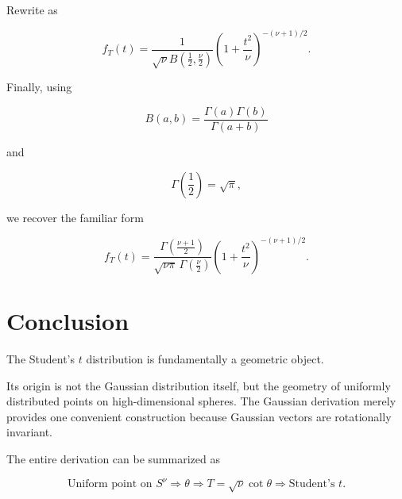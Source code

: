 \documentclass[11pt]{article}
\begin{document}
	Rewrite as
	
	\[
	\boxed{
		f_T(t)
		=
		\frac1{
			\sqrt{\nu}
			B\left(\frac12,\frac\nu2\right)
		}
		\left(
		1+\frac{t^2}{\nu}
		\right)^{-(\nu+1)/2}.
	}
	\]
	
	Finally, using
	
	\[
	B(a,b)
	=
	\frac{\Gamma(a)\Gamma(b)}
	{\Gamma(a+b)}
	\]
	
	and
	
	\[
	\Gamma\!\left(\frac12\right)
	=
	\sqrt{\pi},
	\]
	
	we recover the familiar form
	
	\[
	\boxed{
		f_T(t)
		=
		\frac{
			\Gamma\left(\frac{\nu+1}{2}\right)
		}{
			\sqrt{\nu\pi}\,
			\Gamma\left(\frac\nu2\right)
		}
		\left(
		1+\frac{t^2}{\nu}
		\right)^{-(\nu+1)/2}.
	}
	\]
	
	
	\section{Conclusion}
	
	The Student's $t$ distribution is fundamentally a geometric object.
	
	Its origin is not the Gaussian distribution itself, but the geometry of uniformly distributed points on high-dimensional spheres. The Gaussian derivation merely provides one convenient construction because Gaussian vectors are rotationally invariant.
	
	The entire derivation can be summarized as
	
	\[
	\boxed{
		\text{Uniform point on }S^\nu
		\Longrightarrow
		\theta
		\Longrightarrow
		T=\sqrt{\nu}\cot\theta
		\Longrightarrow
		\text{Student's }t.
	}
	\]
	
\end{document}
